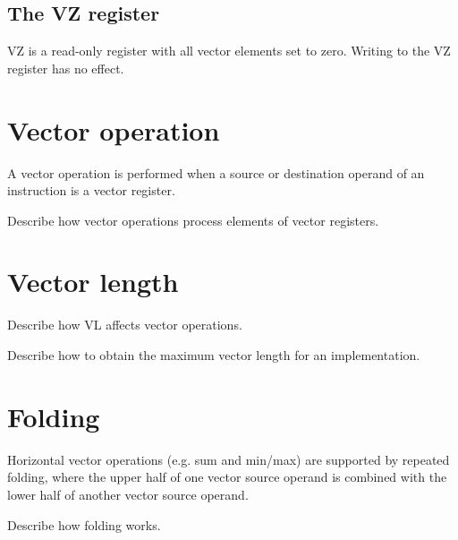 \subsection{The VZ register}

VZ is a read-only register with all vector elements set to zero. Writing to the
VZ register has no effect.

\section{Vector operation}

A vector operation is performed when a source or destination operand of an
instruction is a vector register.

\begin{todobox}
  Describe how vector operations process elements of vector registers.
\end{todobox}

\section{Vector length}

\begin{todobox}
  Describe how VL affects vector operations.

  Describe how to obtain the maximum vector length for an implementation.
\end{todobox}

\section{Folding}

Horizontal vector operations (e.g. sum and min/max) are supported by repeated
folding, where the upper half of one vector source operand is combined with the
lower half of another vector source operand.

\begin{todobox}
  Describe how folding works.
\end{todobox}
